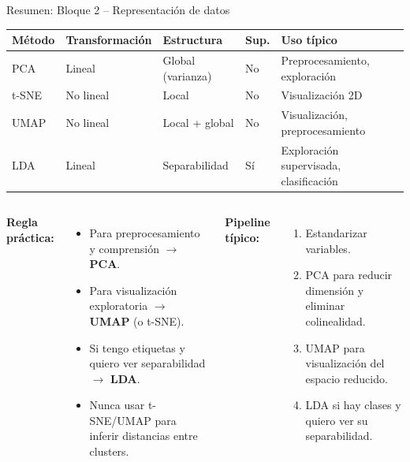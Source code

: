 \documentclass[aspectratio=169]{beamer}
\begin{document}
\begin{frame}{Resumen: Bloque 2 -- Representación de datos}
\begin{center}
\renewcommand{\arraystretch}{1.4}
{\small
\begin{tabular}{lllll}
\toprule
\textbf{Método} & \textbf{Transformación} & \textbf{Estructura} & \textbf{Sup.} & \textbf{Uso típico} \\
\midrule
PCA   & Lineal    & Global (varianza)   & No & Preprocesamiento, exploración \\
t-SNE & No lineal & Local               & No & Visualización 2D \\
UMAP  & No lineal & Local + global      & No & Visualización, preprocesamiento \\
LDA   & Lineal    & Separabilidad       & Sí & Exploración supervisada, clasificación \\
\bottomrule
\end{tabular}
}
\end{center}

\medskip
\begin{columns}[T]
\textbf{Regla práctica:}
\begin{itemize}
  \item Para preprocesamiento y comprensión $\to$ \textbf{PCA}.
  \item Para visualización exploratoria $\to$ \textbf{UMAP} (o t-SNE).
  \item Si tengo etiquetas y quiero ver separabilidad $\to$ \textbf{LDA}.
  \item Nunca usar t-SNE/UMAP para inferir distancias entre clusters.
\end{itemize}

\textbf{Pipeline típico:}
\begin{enumerate}
  \item Estandarizar variables.
  \item PCA para reducir dimensión y eliminar colinealidad.
  \item UMAP para visualización del espacio reducido.
  \item LDA si hay clases y quiero ver su separabilidad.
\end{enumerate}
\end{columns}
\end{frame}
\end{document}
